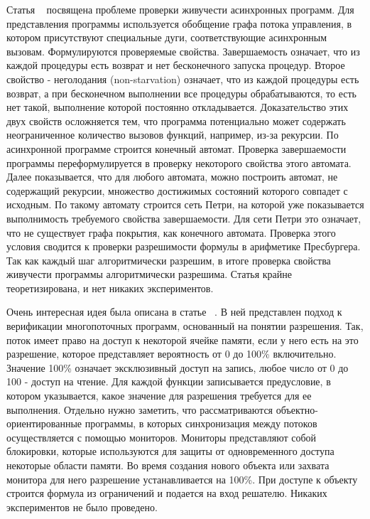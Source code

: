Статья ~\cite{Ganty:2009:POPL} посвящена проблеме проверки живучести асинхронных программ. Для представления программы используется обобщение графа потока управления, в котором присутствуют специальные дуги, соответствующие асинхронным вызовам. Формулируются проверяемые свойства. Завершаемость означает, что из каждой процедуры есть возврат и нет бесконечного запуска процедур. Второе свойство - неголодания (non-starvation) означает, что из каждой процедуры есть возврат, а при бесконечном выполнении все процедуры обрабатываются, то есть нет такой, выполнение которой постоянно откладывается. 
Доказательство этих двух свойств осложняется тем, что программа потенциально может содержать неограниченное количество вызовов функций, например, из-за рекурсии.
По асинхронной программе строится конечный автомат. Проверка завершаемости программы переформулируется в проверку некоторого свойства этого автомата. Далее показывается, что для любого автомата, можно построить автомат, не содержащий рекурсии, множество достижимых состояний которого совпадет с исходным. По такому автомату строится сеть Петри, на которой уже показывается выполнимость требуемого свойства завершаемости. Для сети Петри это означает, что не существует графа покрытия, как конечного автомата. Проверка этого условия сводится к проверки разрешимости формулы в арифметике Пресбургера. Так как каждый шаг алгоритмически разрешим, в итоге проверка свойства живучести программы алгоритмически разрешима. 
Статья крайне теоретизирована, и нет никаких экспериментов.

Очень интересная идея была описана в статье ~\cite{Leino:2009}. В ней представлен подход к верификации многопоточных программ, основанный на понятии разрешения. Так, поток имеет право на доступ к некоторой ячейке памяти, если у него есть на это разрешение, которое представляет вероятность от 0 до 100\% включительно. Значение 100\% означает эксклюзивный доступ на запись, любое число от 0 до 100 - доступ на чтение. Для каждой функции записывается предусловие, в котором указывается, какое значение для разрешения требуется для ее выполнения. Отдельно нужно заметить, что рассматриваются объектно-ориентированные программы, в которых синхронизация между потоков осуществляется с помощью мониторов. Мониторы представляют собой блокировки, которые используются для защиты от одновременного доступа некоторые области памяти. Во время создания нового объекта или захвата монитора для него разрешение устанавливается на 100\%. При доступе к объекту строится формула из ограничений и подается на вход решателю.
Никаких экспериментов не было проведено.

